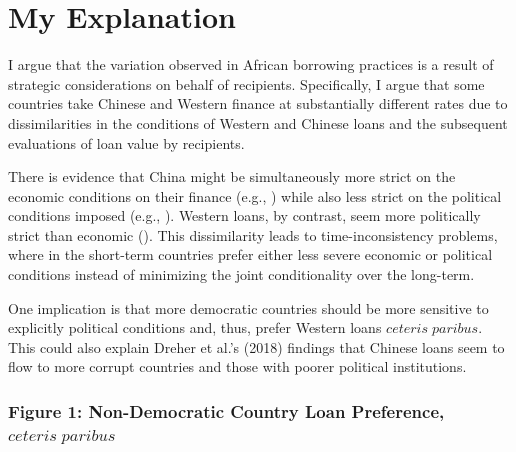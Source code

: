 \documentclass{article}
\begin{document}
\section*{My Explanation}
I argue that the variation observed in African borrowing practices is a result of strategic considerations on behalf of recipients. Specifically, I argue that some countries take Chinese and Western finance at substantially different rates due to dissimilarities in the conditions of Western and Chinese loans and the subsequent evaluations of loan value by recipients.

There is evidence that China might be simultaneously more strict on the economic conditions on their finance (e.g., \cite{dreher2018}) while also less strict on the political conditions imposed (e.g., \cite{dreher2018}). Western loans, by contrast, seem more politically strict than economic (\cite{hernandez2017}). This dissimilarity leads to time-inconsistency problems, where in the short-term countries prefer either less severe economic or political conditions instead of minimizing the joint conditionality over the long-term.

One implication is that more democratic countries should be more sensitive to explicitly political conditions and, thus, prefer Western loans $ceteris\;paribus$. This could also explain Dreher et al.'s (2018) findings that Chinese loans seem to flow to more corrupt countries and those with poorer political institutions.

\subsubsection*{Figure 1: Non-Democratic Country Loan Preference, $ceteris\;paribus$}
\end{document}
